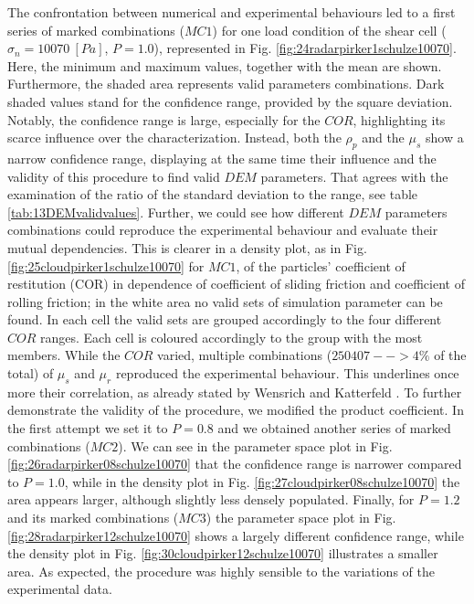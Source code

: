 The confrontation between numerical and experimental behaviours led to a first
series of marked combinations ($MC1$) for one load condition of
the shear cell ($\sigma_n=10070 ~[Pa]$, $P=1.0$), represented in Fig.
\ref{fig:24radarpirker1schulze10070}.
Here, the minimum and maximum values, together with the mean are shown. 
Furthermore, the shaded area represents valid parameters combinations.
Dark shaded values stand for the confidence range, provided by the square
deviation.
Notably, the confidence range is large, 
especially for the $COR$, highlighting its scarce influence over the characterization. 
Instead, both the $\rho_p$  and the $\mu_s$ show a narrow confidence range, 
displaying at the same time their influence and the validity of this procedure to find valid $DEM$ parameters. 
That agrees with the examination of the ratio of the standard deviation to the
range, see table \ref{tab:13DEMvalidvalues}.
Further, we could see how different $DEM$ parameters
combinations could reproduce the experimental behaviour and evaluate their mutual dependencies. 
This is clearer in a density plot, as in Fig. 
\ref{fig:25cloudpirker1schulze10070} for $MC1$, 
of the particles' coefficient of restitution (COR) in dependence
of coefficient of sliding friction and coefficient of rolling friction; in the
white area no valid sets of simulation parameter can be found.
In each cell the valid sets are grouped accordingly to the four different $COR$
ranges.
Each cell is coloured accordingly to the group with the most members. 
While the $COR$ varied, multiple
combinations ($250407 --> 4\% $ of the total) of $\mu_s$ and $\mu_r$ reproduced
the experimental behaviour.
This underlines once more their correlation, as already stated by Wensrich and 
Katterfeld \cite{RefWorks:87}.
To further demonstrate the validity of the procedure, we modified the product
coefficient. In the first attempt we set it to $P=0.8$ and we obtained another
series of marked combinations ($MC2$).
We can see in the parameter space plot in Fig.
\ref{fig:26radarpirker08schulze10070} that the confidence range is narrower
compared to $P=1.0$, while in the density plot in Fig. 
\ref{fig:27cloudpirker08schulze10070} the area
appears larger, although slightly less densely populated. Finally, for $P=1.2$
and its marked combinations ($MC3$) the parameter space plot in Fig.
\ref{fig:28radarpirker12schulze10070} shows a largely different confidence
range, while the density plot in Fig. \ref{fig:30cloudpirker12schulze10070} 
illustrates a smaller area. As expected, the procedure was highly sensible to the variations of the experimental data. 

